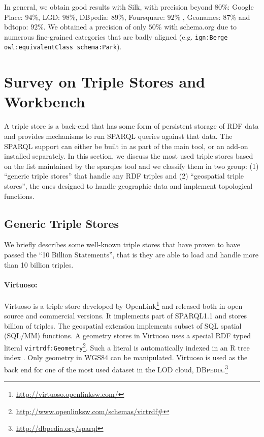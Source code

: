 In general, we obtain good results with Silk, with precision beyond $80$\%: Google Place: $94$\%, LGD: $98$\%, DBpedia: $89$\%, Foursquare: $92$\% , Geonames: $87$\% and bdtopo: $92$\%. We obtained a precision of only $50$\% with schema.org due to numerous fine-grained categories that are badly aligned (e.g. \texttt{ign:Berge owl:equivalentClass schema:Park}).

\section{Survey on Triple Stores and Workbench}
\label{sec:surveytps}

A triple store is a back-end that has some form of persistent storage of RDF data and provides mechanisms to run SPARQL \cite{sparql11} queries against that data. The SPARQL support can either be built in as part of the main tool, or an add-on installed separately. In this section, we discuss the most used triple stores based on the list maintained by the sparqles tool \cite{sparqles13} and we classify them in two group: (1) ``generic triple stores'' that handle any RDF triples and (2) ``geospatial triple stores'', the ones designed to handle geographic data and implement topological functions.


\subsection{Generic Triple Stores}
\label{sec:genrictps}

We briefly describes some well-known triple stores that have proven to have passed the ``10 Billion Statements'', that is they are able to load and handle more than 10 billion triples.

\paragraph{Virtuoso:}
Virtuoso is a triple store developed by OpenLink\footnote{\url{http://virtuoso.openlinksw.com/}} and released both in open source and commercial versions. It implements part of SPARQL1.1 and stores billion of triples. The geospatial extension implements subset of SQL spatial (SQL/MM) \cite{ashworth99} functions. A geometry stores in Virtuoso uses a special RDF typed literal \texttt{virtrdf:Geometry}\footnote{\url{http://www.openlinksw.com/schemas/virtrdf\#}}. Such a literal is automatically indexed in an R tree index \cite{rtree84}. Only geometry in WGS84 can be manipulated. Virtuoso is used as the back end for one of the most used dataset in the LOD cloud, \textsc{DBpedia.}\footnote{\url{http://dbpedia.org/sparql}}



